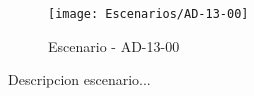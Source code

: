 \begin{figure}[H]
\centering
\texttt{[image: Escenarios/AD-13-00]}
\caption{Escenario - AD-13-00}
\label{fig:AD-13-00}
\end{figure}

Descripcion escenario...
\clearpage
